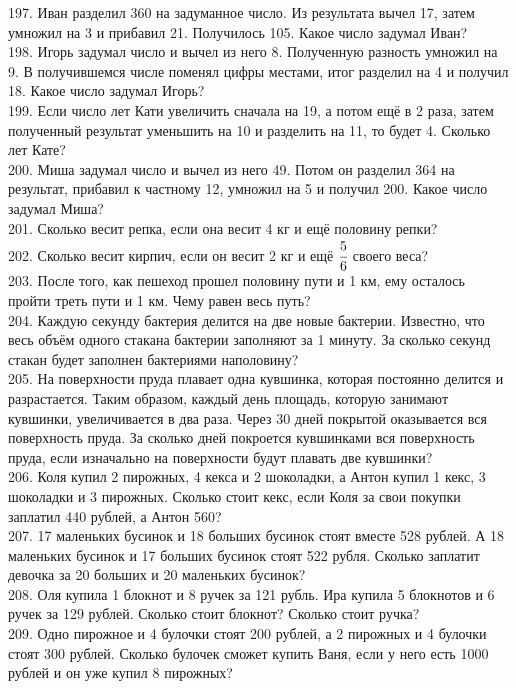 197. Иван разделил 360 на задуманное число. Из результата вычел 17, затем умножил на 3 и прибавил 21. Получилось 105. Какое число задумал Иван?\\
198. Игорь задумал число и вычел из него 8. Полученную разность умножил на 9. В получившемся числе поменял цифры местами, итог разделил на 4 и получил 18. Какое число задумал Игорь?\\
199.  Если число лет Кати увеличить сначала на 19, а потом ещё в 2 раза, затем полученный результат уменьшить на 10 и разделить на 11, то будет 4. Сколько лет Кате?\\
200. Миша задумал число и вычел из него 49. Потом он разделил 364 на результат, прибавил к частному 12, умножил на 5 и получил 200. Какое число задумал Миша?\\
201. Сколько весит репка, если она весит 4 кг и ещё половину репки?\\
202. Сколько весит кирпич, если он весит 2 кг и ещё $\cfrac{5}{6}$ своего веса?\\
203. После того, как пешеход прошел половину пути и 1 км, ему осталось пройти треть пути и 1 км. Чему равен весь путь?\\
204. Каждую секунду бактерия делится на две новые бактерии. Известно, что весь объём одного стакана бактерии заполняют за 1 минуту. За сколько секунд стакан будет заполнен бактериями наполовину?\\
205. На поверхности пруда плавает одна кувшинка, которая постоянно делится и разрастается. Таким образом, каждый день площадь, которую занимают кувшинки, увеличивается в два раза. Через 30 дней покрытой оказывается вся поверхность пруда. За сколько дней покроется кувшинками вся поверхность пруда, если изначально на поверхности будут плавать две кувшинки?\\
206. Коля купил 2 пирожных, 4 кекса и 2 шоколадки, а Антон купил 1 кекс, 3 шоколадки и 3 пирожных. Сколько стоит кекс, если Коля за свои покупки заплатил 440 рублей, а Антон 560?\\
207. 17 маленьких бусинок и 18 больших бусинок стоят вместе 528 рублей. А 18 маленьких бусинок и 17 больших бусинок стоят 522 рубля. Сколько заплатит девочка за 20 больших и 20 маленьких бусинок?\\
208. Оля купила 1 блокнот и 8 ручек за 121 рубль. Ира купила 5 блокнотов и 6 ручек за 129 рублей. Сколько стоит блокнот? Сколько стоит ручка?\\
209. Одно пирожное и 4 булочки стоят 200 рублей, а 2 пирожных и 4 булочки стоят 300 рублей. Сколько булочек сможет купить Ваня, если у него есть 1000 рублей и он уже купил 8 пирожных?\\

